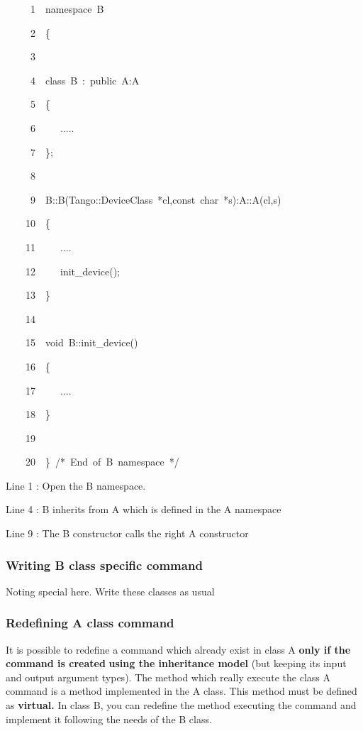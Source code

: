 
\begin{lyxcode}
~~~~~1~~namespace~B

~~~~~2~~\{

~~~~~3~~

~~~~~4~~class~B~:~public~A:A

~~~~~5~~\{

~~~~~6~~~~~.....

~~~~~7~~\};

~~~~~8~~

~~~~~9~~B::B(Tango::DeviceClass~{*}cl,const~char~{*}s):A::A(cl,s)

~~~~10~~\{

~~~~11~~~~~....

~~~~12~~~~~init\_device();

~~~~13~~\}

~~~~14~~

~~~~15~~void~B::init\_device()

~~~~16~~\{

~~~~17~~~~~....

~~~~18~~\}

~~~~19~~

~~~~20~~\}~/{*}~End~of~B~namespace~{*}/
\end{lyxcode}


Line 1 : Open the B namespace.

Line 4 : B inherits from A which is defined in the A namespace

Line 9 : The B constructor calls the right A constructor


\subsubsection{Writing B class specific command}

Noting special here. Write these classes as usual


\subsubsection{Redefining A class command}

It is possible to redefine a command which already exist in class
A \textbf{only if the command is created} \textbf{using the inheritance
model} (but keeping its input and output argument types). The method
which really execute the class A command is a method implemented in
the A class. This method must be defined as \textbf{virtual.} In class
B, you can redefine the method executing the command and implement
it following the needs of the B class.




